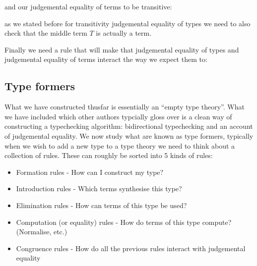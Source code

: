 \begin{defin}
    and our judgemental equality of terms to be transitive:
    \begin{prooftree}
    \end{prooftree}

    as we stated before for transitivity judgemental equality of types we need to also check that the middle term $T$ is actually a term.

    Finally we need a rule that will make  that judgemental equality of types and judgemental equality of terms interact the way we expect them to:
    \begin{prooftree}
    \end{prooftree}
\end{defin}

\subsection{Type formers}
What we have constructed thusfar is essentially an ``empty type theory''. What we have included which other authors typcially gloss over is a clean way of constructing a typechecking algorithm: bidirectional typechecking and an account of judgemental equality. We now study what are known as type formers, typically when we wish to add a new type to a type theory we need to think about a collection of rules. These can roughly be sorted into 5 kinds of rules:

\begin{itemize}
    \item Formation rules - How can I construct my type?
    \item Introduction rules - Which terms synthesise this type?
    \item Elimination rules - How can terms of this type be used?
    \item Computation (or equality) rules - How do terms of this type compute? (Normalise, etc.)
    \item Congruence rules - How do all the previous rules interact with judgemental equality
\end{itemize}

